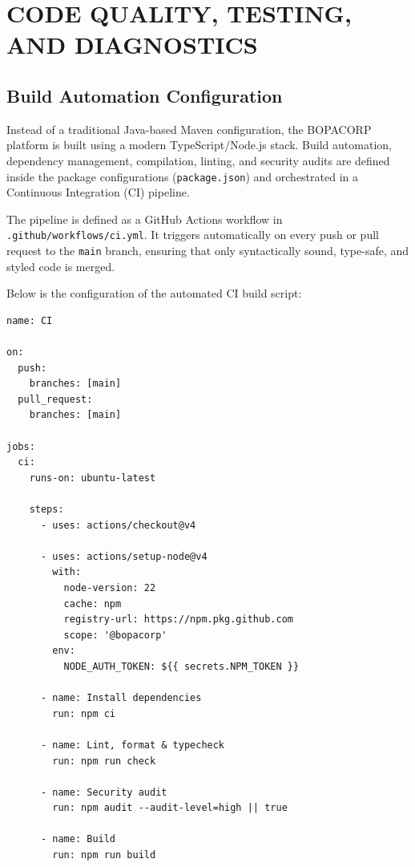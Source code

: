 \documentclass[letterpaper%
, oneside%
, 12pt%
, memoireprojet%
, english%
,creativecommons,hyperref, withAlgo2e %
]{thETS}
\begin{document}
\chapter{CODE QUALITY, TESTING, AND DIAGNOSTICS}

\section{Build Automation Configuration}
Instead of a traditional Java-based Maven configuration, the BOPACORP platform is built using a modern TypeScript/Node.js stack. Build automation, dependency management, compilation, linting, and security audits are defined inside the package configurations (\texttt{package.json}) and orchestrated in a Continuous Integration (CI) pipeline.

The pipeline is defined as a GitHub Actions workflow in \texttt{.github/workflows/ci.yml}. It triggers automatically on every push or pull request to the \texttt{main} branch, ensuring that only syntactically sound, type-safe, and styled code is merged.

Below is the configuration of the automated CI build script:

\begin{verbatim}
name: CI

on:
  push:
    branches: [main]
  pull_request:
    branches: [main]

jobs:
  ci:
    runs-on: ubuntu-latest

    steps:
      - uses: actions/checkout@v4

      - uses: actions/setup-node@v4
        with:
          node-version: 22
          cache: npm
          registry-url: https://npm.pkg.github.com
          scope: '@bopacorp'
        env:
          NODE_AUTH_TOKEN: ${{ secrets.NPM_TOKEN }}

      - name: Install dependencies
        run: npm ci

      - name: Lint, format & typecheck
        run: npm run check

      - name: Security audit
        run: npm audit --audit-level=high || true

      - name: Build
        run: npm run build
\end{verbatim}
\end{document}
